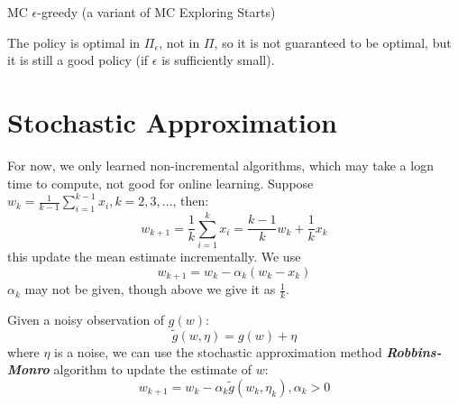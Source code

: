 \documentclass[10pt]{elegantbook}
\newcommand{\mydefination}[1]{\textbf{\textit{\textcolor{structurecolor}{#1}}}}
\begin{document}
\begin{algorithm}[H]
\caption{MC $\epsilon$-greedy (a variant of MC Exploring Starts)}
\KwIn{Initial policy $\pi_0(a|s)$, $Q(s,a)$, $\text{Returns}(s,a)=0$, $\text{Num}(s,a)=0, \forall (s,a). \epsilon \in (0, 1]$}

\end{algorithm}

\vspace{\baselineskip}

The policy is optimal in $\Pi_{\epsilon}$, not in $\Pi$, so it is not guaranteed to be optimal, but it is still a good policy (if $\epsilon$ is sufficiently small).


\section{Stochastic Approximation}
For now, we only learned non-incremental algorithms, which may take a logn time to compute, not good for online learning.
Suppose $w_{k} = \frac{1}{k-1} \sum_{i=1}^{k-1} x_i, k = 2, 3, \ldots$, then:
\[ w_{k+1} = \frac{1}{k} \sum_{i=1}^{k} x_i = \frac{k-1}{k} w_k + \frac{1}{k} x_k \]
this update the mean estimate incrementally. We use 
\begin{equation}
    w_{k+1} = w_{k} - \alpha_k (w_{k} - x_k)
\end{equation}
$\alpha_k$ may not be given, though 
above we give it as $\frac{1}{k}$.

Given a noisy observation of $g(w)$:
\[ \tilde{g}(w, \eta) = g(w) + \eta \]
where $\eta$ is a noise, we can use the stochastic approximation method \mydefination{Robbins-Monro} algorithm to update the estimate of $w$:
\begin{equation}
    w_{k+1} = w_k - \alpha_k \tilde{g}(w_k, \eta_k), \alpha_k > 0
\end{equation}
\end{document}
